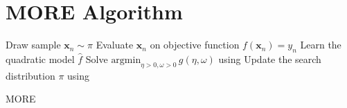 %
%
%
%
%
%     
%
%
%
%
%
%

\section{MORE Algorithm}
\begin{algorithm}[H]
\renewcommand{\algorithmcfname}{Algorithm}
\DontPrintSemicolon
\SetAlgoLined
{}
{
  {
    Draw sample $\mathbf{x}_n \sim \pi$\;
    Evaluate $\mathbf{x}_n$ on objective function $f(\mathbf{x}_n) = y_n$\;
  }
  Learn the quadratic model $\hat{f}$ \;
  Solve  $\text{argmin}_{\eta >0, \omega > 0} \, g(\eta, \omega)$
  using  \;
  Update the search distribution $\pi$ using \;
}
\caption{MORE}
\label{alg:more_appendix}
\end{algorithm}
